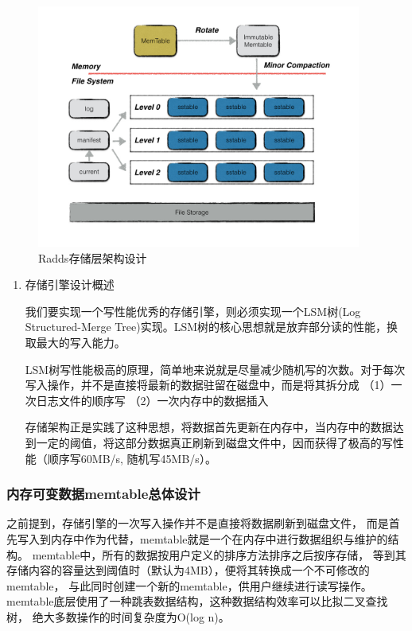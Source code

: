 	\begin{figure}[H]
		\centering
		\includegraphics[width=0.95\textwidth]{images/radds_storage_arch}
		\caption{Radds存储层架构设计}
		\label{mobile_overall_design}
	\end{figure}


	\begin{enumerate}[fullwidth,itemindent=2em,listparindent=2em]
	
		\item 存储引擎设计概述
		
		我们要实现一个写性能优秀的存储引擎，则必须实现一个LSM树(Log Structured-Merge Tree)实现。LSM树的核心思想就是放弃部分读的性能，换取最大的写入能力。

		LSM树写性能极高的原理，简单地来说就是尽量减少随机写的次数。对于每次写入操作，并不是直接将最新的数据驻留在磁盘中，而是将其拆分成
		（1）{一次日志文件的顺序写}
		（2）{一次内存中的数据插入}

		存储架构正是实践了这种思想，将数据首先更新在内存中，当内存中的数据达到一定的阈值，将这部分数据真正刷新到磁盘文件中，因而获得了极高的写性能（顺序写60MB/s, 随机写45MB/s）。

	\end{enumerate}
		\subsubsection{内存可变数据memtable总体设计}
		
		之前提到，存储引擎的一次写入操作并不是直接将数据刷新到磁盘文件，
		而是首先写入到内存中作为代替，memtable就是一个在内存中进行数据组织与维护的结构。
		memtable中，所有的数据按用户定义的排序方法排序之后按序存储，
		等到其存储内容的容量达到阈值时（默认为4MB），便将其转换成一个不可修改的memtable，
		与此同时创建一个新的memtable，供用户继续进行读写操作。
		memtable底层使用了一种跳表数据结构，这种数据结构效率可以比拟二叉查找树，
		绝大多数操作的时间复杂度为O(log n)。

